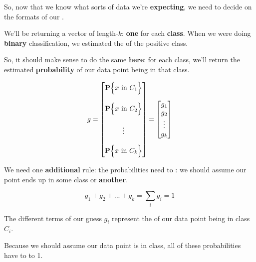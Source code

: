         So, now that we know what sorts of data we're \textbf{expecting}, we need to decide on the formats of our .
        
        We'll be returning a vector of length-$k$: \textbf{one} for each \textbf{class}. When we were doing \textbf{binary} classification, we estimated the  of the positive class.
        
        So, it should make sense to do the same \textbf{here}: for each class, we'll return the estimated \textbf{probability} of our data point being in that class.
        
        \begin{equation}
            g
            =
            \begin{bmatrix}
              \mathbf{P} \Bigl\{x \text{ in } C_1\Bigr\} \\\\
              \mathbf{P} \Bigl\{x \text{ in } C_2\Bigr\} \\\\
              \vdots \\ \\
              \mathbf{P} \Bigl\{x \text{ in } C_k\Bigr\} 
            \end{bmatrix}
            =
            \begin{bmatrix}
              g_1\\g_2\\\vdots\\g_k
            \end{bmatrix}
        \end{equation}
        
        We need one \textbf{additional} rule: the probabilities need to : we should assume our point ends up in some class or \textbf{another}.
        
        \begin{equation}
            g_1+g_2+...+g_k= \sum_i g_i = 1
        \end{equation}
        
        \begin{concept}
            The different terms of our  guess $g_i$ represent the  of our data point being in class $C_i$.
            
            Because we should assume our data point is in  class, all of these probabilities have to  to 1.
        \end{concept}

